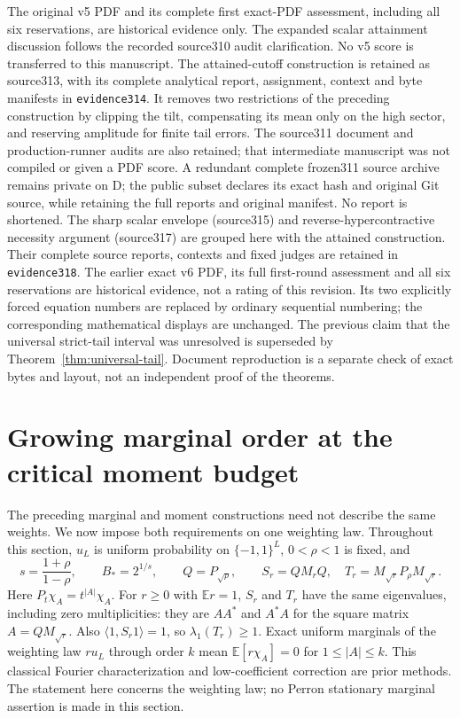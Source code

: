 \documentclass[11pt]{article}
\begin{document}
The original v5 PDF and its complete first exact-PDF assessment, including
all six reservations, are historical evidence only. The expanded scalar
attainment discussion follows the recorded source310 audit clarification.
No v5 score is transferred to this manuscript.
The attained-cutoff construction is retained as source313, with its
complete analytical report, assignment, context and byte manifests in
\texttt{evidence314}. It removes two restrictions of the preceding
construction by clipping the tilt, compensating its mean only on the
high sector, and reserving amplitude for finite tail errors.
The source311 document and production-runner audits are also retained;
that intermediate manuscript was not compiled or given a PDF score.
A redundant complete frozen311 source archive remains private on D;
the public subset declares its exact hash and original Git source, while
retaining the full reports and original manifest. No report is shortened.
The sharp scalar envelope (source315) and reverse-hypercontractive necessity
argument (source317) are grouped here with the attained construction.
Their complete source reports, contexts and fixed judges are retained in
\texttt{evidence318}. The earlier exact v6 PDF, its full first-round
assessment and all six reservations are historical evidence, not a rating
of this revision. Its two explicitly forced equation numbers are replaced
by ordinary sequential numbering; the corresponding mathematical displays
are unchanged. The previous claim that the universal strict-tail interval
was unresolved is superseded by Theorem~\ref{thm:universal-tail}.
Document reproduction is a separate check of exact bytes
and layout, not an independent proof of the theorems.

\section{Growing marginal order at the critical moment budget}
\label{sec:growing-marginals}

The preceding marginal and moment constructions need not describe the same
weights. We now impose both requirements on one weighting law. Throughout
this section, $u_L$ is uniform probability on $\{-1,1\}^L$,
$0<\rho<1$ is fixed, and
\[
 s=\frac{1+\rho}{1-\rho},\qquad B_*=2^{1/s},\qquad
 Q=P_{\sqrt\rho},\qquad
 S_r=QM_rQ,\quad T_r=M_{\sqrt r}P_\rho M_{\sqrt r}.
\]
Here $P_t\chi_A=t^{|A|}\chi_A$. For $r\geq0$ with $\mathbb E r=1$,
$S_r$ and $T_r$ have the same eigenvalues, including zero multiplicities:
they are $AA^*$ and $A^*A$ for the square matrix $A=QM_{\sqrt r}$.
Also $\langle1,S_r1\rangle=1$, so $\lambda_1(T_r)\geq1$.
Exact uniform marginals of the weighting law $r u_L$ through order $k$
mean $\mathbb E[r\chi_A]=0$ for $1\leq|A|\leq k$.
This classical Fourier characterization and low-coefficient correction are prior methods\cite{alon-kwise,rubinfeld-xie}. The statement here concerns the weighting law;
no Perron stationary marginal assertion is made in this section.
\end{document}

